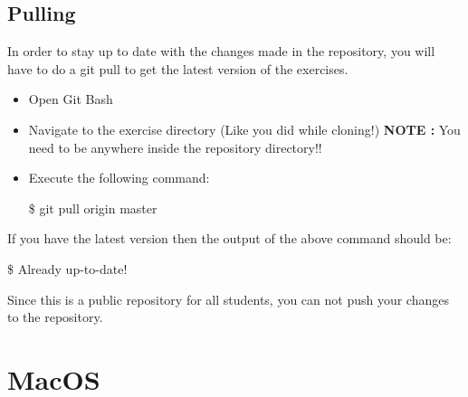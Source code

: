 \documentclass{cmc}
\begin{document}
\subsection{Pulling}
\label{sec:windows_pulling}

In order to stay up to date with the changes made in the repository,
you will have to do a git pull to get the latest version of the
exercises.

\begin{itemize}
\item Open Git Bash
\item Navigate to the exercise directory (Like you did while cloning!)
  \textbf{NOTE : } You need to be anywhere inside the repository
  directory!!
\item Execute the following command:
  \begin{center}
    \$ git pull origin master
  \end{center}
\end{itemize}

If you have the latest version then the output of the above command
should be:

\begin{center}
  \$ Already up-to-date!
\end{center}

Since this is a public repository for all students, you can not push
your changes to the repository.


\section{MacOS}
\label{sec:macos}
\end{document}
